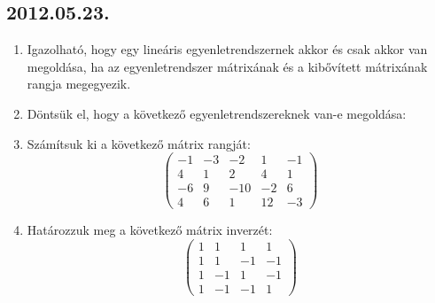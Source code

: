 \subsection*{2012.05.23.}
\begin{enumerate}
\item Igazolható, hogy egy lineáris egyenletrendszernek akkor és csak akkor van megoldása, ha az egyenletrendszer mátrixának és a kibővített mátrixának rangja megegyezik.
\item Döntsük el, hogy a következő egyenletrendszereknek van-e megoldása:
\item Számítsuk ki a következő mátrix rangját:
$$
\begin{pmatrix}
-1&-3&-2&1&-1\\
4&1&2&4&1\\
-6&9&-10&-2&6\\
4&6&1&12&-3
\end{pmatrix}
$$
\item Határozzuk meg a következő mátrix inverzét:
$$
\begin{pmatrix}
1&1&1&1\\
1&1&-1&-1\\
1&-1&1&-1\\
1&-1&-1&1
\end{pmatrix}
$$
\end{enumerate}


